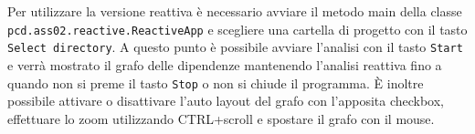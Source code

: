 \documentclass[11pt,notitlepage]{article}
\begin{document}
Per utilizzare la versione reattiva è necessario avviare il metodo main della classe \\
\texttt{pcd.ass02.reactive.ReactiveApp} e scegliere una cartella di progetto con il tasto \texttt{Select directory}.
A questo punto è possibile avviare l'analisi con il tasto \texttt{Start} e verrà mostrato il grafo delle dipendenze mantenendo l'analisi reattiva fino a quando non si preme 
il tasto \texttt{Stop} o non si chiude il programma.
È inoltre possibile attivare o disattivare l'auto layout del grafo con l'apposita checkbox, effettuare lo zoom utilizzando CTRL+scroll e spostare il grafo con il mouse.
\end{document}
